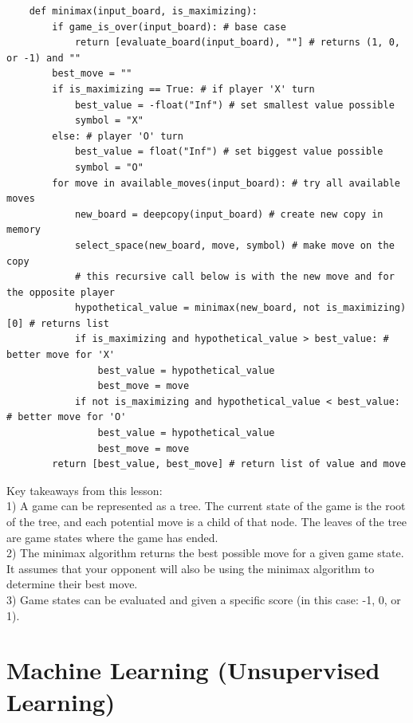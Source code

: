 \documentclass[11pt, a4paper]{article}
\begin{document}
\begin{spacing}{1.1}
	\begin{lstlisting}
	def minimax(input_board, is_maximizing):
		if game_is_over(input_board): # base case
			return [evaluate_board(input_board), ""] # returns (1, 0, or -1) and ""
		best_move = ""
		if is_maximizing == True: # if player 'X' turn
			best_value = -float("Inf") # set smallest value possible
			symbol = "X"
		else: # player 'O' turn
			best_value = float("Inf") # set biggest value possible
			symbol = "O"
		for move in available_moves(input_board): # try all available moves
			new_board = deepcopy(input_board) # create new copy in memory
			select_space(new_board, move, symbol) # make move on the copy
			# this recursive call below is with the new move and for the opposite player
			hypothetical_value = minimax(new_board, not is_maximizing)[0] # returns list
			if is_maximizing and hypothetical_value > best_value: # better move for 'X'
				best_value = hypothetical_value
				best_move = move
			if not is_maximizing and hypothetical_value < best_value: # better move for 'O'
				best_value = hypothetical_value
				best_move = move
		return [best_value, best_move] # return list of value and move \end{lstlisting} \vspace*{1mm}
	Key takeaways from this lesson: \\
	1) A game can be represented as a tree. The current state of the game is the root of the tree, and each potential move is a child of that node. The leaves of the tree are game states where the game has ended. \\
	2) The minimax algorithm returns the best possible move for a given game state. It assumes that your opponent will also be using the minimax algorithm to determine their best move. \\
	3) Game states can be evaluated and given a specific score (in this case: -1, 0, or 1). \newpage

	\section{Machine Learning (Unsupervised Learning)}

\end{spacing}
\end{document}
